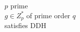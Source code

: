 \documentclass[varwidth,convert={size=1000x}]{standalone}
\begin{document}
$p$ prime\\
$g \in Z_p^*$ of prime order $q$\\
satisfies DDH\\
\end{document}
